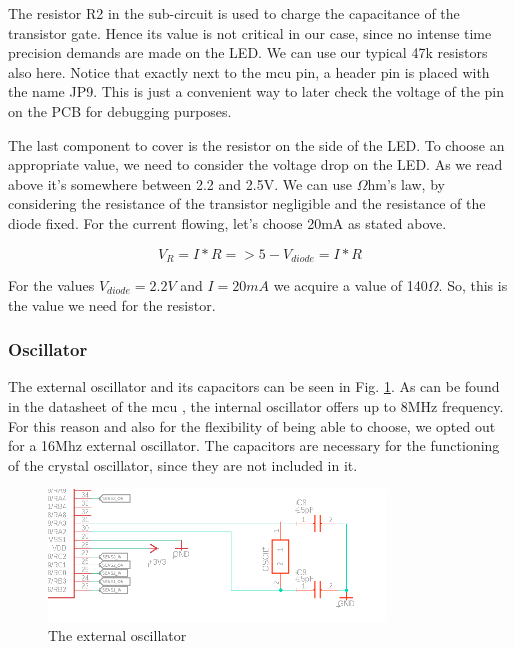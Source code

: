 The resistor R2 in the sub-circuit is used to charge the capacitance of the transistor gate. Hence its value is not critical in our case, since no intense time precision demands are made on the LED. We can use our typical 47k resistors also here. Notice that exactly next to the mcu pin, a header pin is placed with the name JP9. This is just a convenient way to later check the voltage of the pin on the PCB for debugging purposes.


The last component to cover is the resistor on the side of the LED. To choose an appropriate value, we need to consider the voltage drop on the LED. As we read above it's somewhere between 2.2 and 2.5V. We can use $\Omega$hm's law, by considering the resistance of the transistor negligible and the resistance of the diode fixed. For the current flowing, let's choose 20mA as stated above. 

$$V_R = I * R => 5 - V_{diode} = I * R$$

For the values $V_{diode} = 2.2V$ and $I = 20mA$ we acquire a value of 140$\Omega$. So, this is the value we need for the resistor.

\vspace{1cm}

\subsubsection{Oscillator}

The external oscillator and its capacitors can be seen in Fig. \ref{fig:oscillator}. As can be found in the datasheet of the mcu \cite{mcu}, the internal oscillator offers up to 8MHz frequency. For this reason and also for the flexibility of being able to choose, we opted out for a 16Mhz external oscillator.
The capacitors are necessary for the functioning of the crystal oscillator, since they are not included in it.

\begin{figure}[htb]
    \centering
    \includegraphics[width=0.8\textwidth]{figures/hardware/Oscillator.PNG}
    \caption{The external oscillator}
    \label{fig:oscillator}
\end{figure}

